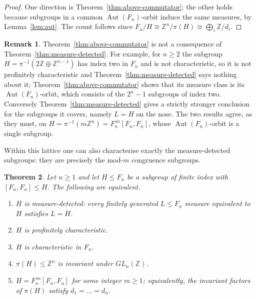 \documentclass[11pt]{amsart}
\theoremstyle{plain}
\newtheorem{theorem}{Theorem}[section]
\theoremstyle{definition}
\newtheorem{remark}[theorem]{Remark}
\newcommand{\Aut}{\operatorname{Aut}}
\begin{document}
\begin{proof}
One direction is Theorem~\ref{thm:above-commutator}; the other holds because
subgroups in a common $\Aut(F_n)$-orbit induce the same measures, by
Lemma~\ref{lem:aut}.  The count follows since
$F_n/H\cong\mathbb Z^{n}/\pi(H)\cong\bigoplus_i\mathbb Z/d_i$.
\end{proof}

\begin{remark}
Theorem~\ref{thm:above-commutator} is not a consequence of
Theorem~\ref{thm:measure-detected}.  For example, for $n\ge2$ the subgroup
$H=\pi^{-1}(2\mathbb Z\oplus\mathbb Z^{n-1})$ has index two in $F_n$ and is not
characteristic, so it is not profinitely characteristic and
Theorem~\ref{thm:measure-detected} says nothing about it;
Theorem~\ref{thm:above-commutator} shows that its measure class is its
$\Aut(F_n)$-orbit, which consists of the $2^{n}-1$ subgroups of index two.
Conversely Theorem~\ref{thm:measure-detected} gives a strictly stronger
conclusion for the subgroups it covers, namely $L=H$ on the nose.  The two
results agree, as they must, on $H=\pi^{-1}(m\mathbb Z^{n})=F_n^{\,m}[F_n,F_n]$,
whose $\Aut(F_n)$-orbit is a single subgroup.
\end{remark}

Within this lattice one can also characterise exactly the measure-detected
subgroups: they are precisely the mod-$m$ congruence subgroups.

\begin{theorem}\label{thm:detected-char}
Let $n\ge1$ and let $H\le F_n$ be a subgroup of finite index with
$[F_n,F_n]\le H$.  The following are equivalent.
\begin{enumerate}
\item[(i)]   $H$ is measure-detected: every finitely generated $L\le F_n$
             measure equivalent to $H$ satisfies $L=H$.
\item[(ii)]  $H$ is profinitely characteristic.
\item[(iii)] $H$ is characteristic in $F_n$.
\item[(iv)]  $\pi(H)\le\mathbb Z^{n}$ is invariant under $GL_n(\mathbb Z)$.
\item[(v)]   $H=F_n^{\,m}[F_n,F_n]$ for some integer $m\ge1$; equivalently, the
             invariant factors of $\pi(H)$ satisfy $d_1=\dots=d_n$.
\end{enumerate}
\end{theorem}
\end{document}

